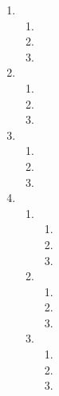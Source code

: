 \documentclass[12pt]{article}
\begin{document}
\begin{enumerate}
\item
    \begin{enumerate}
    \item
    \item[($\beta$)]
    \item
    \end{enumerate}
\item
    \begin{enumerate}
    \item
    \item
    \item
    \end{enumerate}
\item[517.]
    \begin{enumerate}
    \item
    \item
    \item
    \end{enumerate}
\item
    \begin{enumerate}
    \item
        \begin{enumerate}
        \item
        \item
        \item[ape.]
        \end{enumerate}
    \item
        \begin{enumerate}
        \item
        \item
        \item
        \end{enumerate}
    \item
        \begin{enumerate}
        \item
        \item
        \item
        \end{enumerate}
    \end{enumerate}
\end{enumerate}

 
\end{document}
